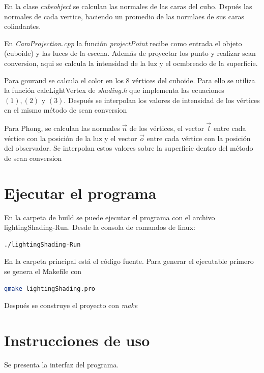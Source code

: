 \documentclass[12pt]{article}
\begin{document}
En la clase \textit{cubeobject} se calculan las normales de las caras del cubo. Dspués las normales de cada vertice, haciendo un promedio de las normlaes de sus caras colindantes.

En \textit{CamProjection.cpp} la función \textit{projectPoint} recibe como entrada el objeto (cuboide) y las luces de la escena. Además de proyectar los punto y realizar scan conversion, aqui se calcula la intensidad de la luz y el ocmbreado de la superficie.

Para gouraud se calcula el color en los 8 vértices del cuboide. Para ello se utiliza la función calcLightVertex de \textit{shading.h} que implementa las ecuaciones $(1), (2)$ y $(3)$. 
Después se interpolan los valores de intensidad de los vértices en el mismo método de scan conversion

Para Phong, se calculan las normales $\vec{n}$ de los vértices, el vector $\vec{l}$ entre cada vértice con la posición de la luz y el vector $\vec{o}$ entre cada vértice con la posición del observador. Se interpolan estos valores sobre la superficie dentro del método de scan conversion

\section{Ejecutar el programa}
En la carpeta de build se puede ejecutar el programa con el archivo lightingShading-Run. Desde la consola de comandos de linux:

\begin{lstlisting}[language=bash,title={bash}]
./lightingShading-Run
\end{lstlisting}


En la carpeta principal está el código fuente. Para generar el ejecutable primero se genera el Makefile con

\begin{lstlisting}[language=bash,title={bash}]
 qmake lightingShading.pro
\end{lstlisting}

Después se construye el proyecto con \textit{make}



\section{Instrucciones de uso}
Se presenta la interfaz del programa.
\end{document}
